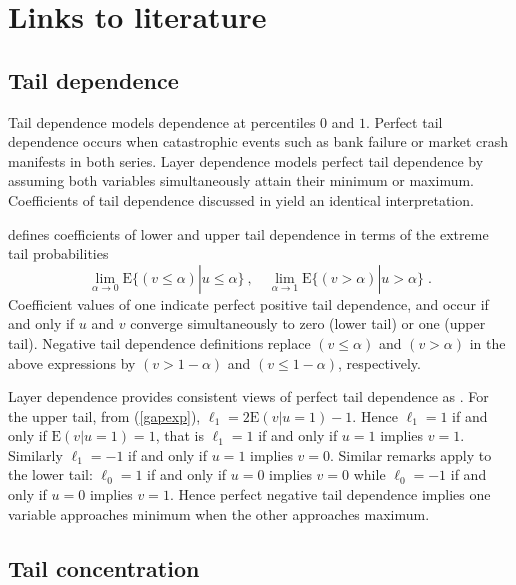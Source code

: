 \documentclass[authoryear]{elsarticle}
\newcommand{\E}{{\mathrm E}}
\newcommand{\cq}{\ ,\quad }
\newcommand{\eref}[1]{(\ref{#1})}
\begin{document}
\section{Links to literature}\label{sliterature}





\subsection{Tail dependence}


Tail dependence models dependence at percentiles $0$ and $1$. Perfect tail dependence occurs when catastrophic events such as  bank failure or  market crash manifests in both  series.  Layer dependence models perfect tail dependence by assuming both variables  simultaneously attain their minimum or maximum.  Coefficients of tail dependence discussed in  \cite{joe1997multivariate} yield an identical interpretation.


 \cite{joe1997multivariate} defines coefficients of lower and upper tail dependence in terms of the extreme tail probabilities
 $$
\lim_{\alpha\rightarrow 0} \E\{(v\leq \alpha) |u\leq \alpha\} \cq
\lim_{\alpha\rightarrow 1} \E\{(v>\alpha )|u>\alpha\} \;.
$$
Coefficient values of one indicate perfect positive tail dependence, and occur if and only if $u$ and $v$ converge simultaneously to zero (lower tail) or one (upper tail). Negative tail dependence definitions replace $(v\leq \alpha)$ and $(v>\alpha)$ in the above expressions by $(v>1-\alpha)$ and $(v\leq 1-\alpha)$, respectively.


Layer dependence provides consistent views of perfect tail dependence as \cite{joe1997multivariate}. For the upper tail, from \eref{gapexp}, $\ell_1=2\E(v|u=1)-1$. Hence $\ell_1=1$ if and only if $\E(v|u=1)=1$, that is $\ell_1=1$ if and only if $u=1$ implies $v=1$.   Similarly $\ell_1=-1$ if and only if $u=1$ implies $v=0$. Similar remarks apply to the lower tail:   $\ell_0=1$ if and only if $u=0$ implies $v=0$ while $\ell_0=-1$ if and only if $u=0$ implies $v=1$. Hence perfect negative tail dependence implies one variable approaches minimum when the other approaches maximum.


\subsection{Tail concentration}
\end{document}
